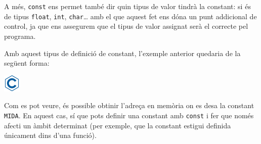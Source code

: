 \documentclass[]{book}
\newenvironment{Shaded}{\begin{snugshade}}{\end{snugshade}}
\newcommand{\DataTypeTok}[1]{\textcolor[rgb]{0.13,0.29,0.53}{#1}}
\newcommand{\DecValTok}[1]{\textcolor[rgb]{0.00,0.00,0.81}{#1}}
\newcommand{\CharTok}[1]{\textcolor[rgb]{0.31,0.60,0.02}{#1}}
\newcommand{\SpecialCharTok}[1]{\textcolor[rgb]{0.00,0.00,0.00}{#1}}
\newcommand{\StringTok}[1]{\textcolor[rgb]{0.31,0.60,0.02}{#1}}
\newcommand{\ImportTok}[1]{#1}
\newcommand{\CommentTok}[1]{\textcolor[rgb]{0.56,0.35,0.01}{\textit{#1}}}
\newcommand{\ControlFlowTok}[1]{\textcolor[rgb]{0.13,0.29,0.53}{\textbf{#1}}}
\newcommand{\PreprocessorTok}[1]{\textcolor[rgb]{0.56,0.35,0.01}{\textit{#1}}}
\newcommand{\NormalTok}[1]{#1}
\begin{document}
A més, \texttt{const} ens permet també dir quin tipus de valor tindrà la
constant: si és de tipus \texttt{float}, \texttt{int},
\texttt{char}\ldots{} amb el que aquest fet ens dóna un punt addicional
de control, ja que ens assegurem que el tipus de valor assignat serà el
correcte pel programa.

Amb aquest tipus de definició de constant, l'exemple anterior quedaria
de la següent forma:

\includegraphics{./img/c.png}

\begin{Shaded}
\end{Shaded}

Com es pot veure, és possible obtinir l'adreça en memòria on es desa la
constant \texttt{MIDA}. En aquest cas, sí que pots definir una constant
amb \texttt{const} i fer que només afecti un àmbit determinat (per
exemple, que la constant estigui definida únicament dins d'una funció).
\end{document}
